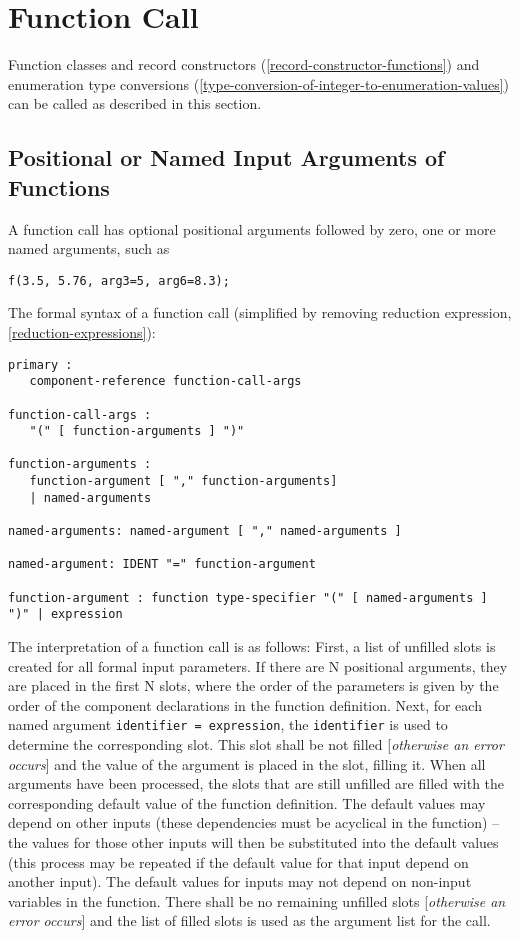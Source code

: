 \section{Function Call}

Function classes and record constructors (\autoref{record-constructor-functions}) and enumeration type
conversions (\autoref{type-conversion-of-integer-to-enumeration-values}) can be called as described in this section.

\subsection{Positional or Named Input Arguments of Functions}

A function call has optional positional arguments followed by zero, one
or more named arguments, such as

\begin{lstlisting}[language=modelica]
f(3.5, 5.76, arg3=5, arg6=8.3);
\end{lstlisting}

The formal syntax of a function call (simplified by removing reduction
expression, \autoref{reduction-expressions}):
\begin{lstlisting}[language=grammar]
primary :
   component-reference function-call-args

function-call-args :
   "(" [ function-arguments ] ")"

function-arguments :
   function-argument [ "," function-arguments]
   | named-arguments

named-arguments: named-argument [ "," named-arguments ]

named-argument: IDENT "=" function-argument

function-argument : function type-specifier "(" [ named-arguments ] ")" | expression
\end{lstlisting}

The interpretation of a function call is as follows: First, a list of
unfilled slots is created for all formal input parameters. If there are
N positional arguments, they are placed in the first N slots, where the
order of the parameters is given by the order of the component
declarations in the function definition. Next, for each named argument
\lstinline!identifier = expression!, the \lstinline!identifier! is used to determine the
corresponding slot. This slot shall be not filled {[}\emph{otherwise an
error occurs}{]} and the value of the argument is placed in the slot,
filling it. When all arguments have been processed, the slots that are
still unfilled are filled with the corresponding default value of the
function definition. The default values may depend on other inputs
(these dependencies must be acyclical in the function) -- the values for
those other inputs will then be substituted into the default values
(this process may be repeated if the default value for that input depend
on another input). The default values for inputs may not depend on
non-input variables in the function. There shall be no remaining
unfilled slots {[}\emph{otherwise an error occurs}{]} and the list of
filled slots is used as the argument list for the call.

